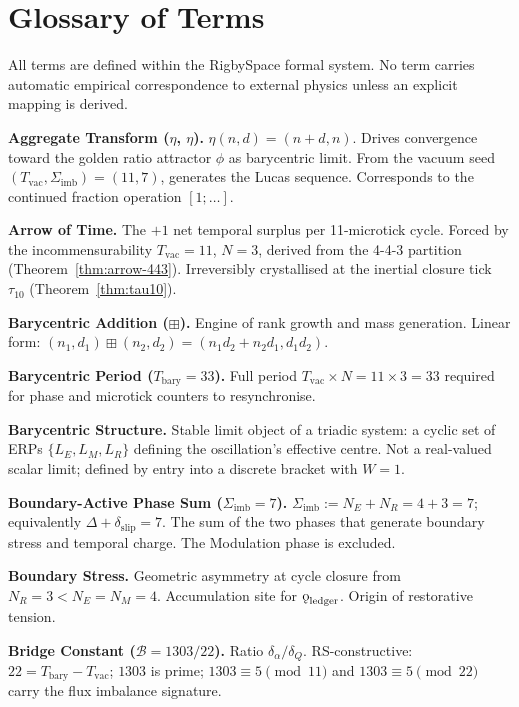\documentclass[11pt, letterpaper]{article}
\newcommand{\aop}{\eta}
\newcommand{\bplus}{\boxplus}
\newcommand{\koppa}{\mathbin{\text{\rm\k{o}}}}
\newcommand{\Tbary}{T_{\mathrm{bary}}}
\newcommand{\Sigimb}{\Sigma_{\mathrm{imb}}}
\theoremstyle{definition}
\theoremstyle{plain}
\begin{document}
\section{Glossary of Terms}\label{sec:glossary}

All terms are defined within the RigbySpace formal system.  No term carries
automatic empirical correspondence to external physics unless an explicit
mapping is derived.

\bigskip

\noindent\textbf{Aggregate Transform ($\eta$, $\aop$).}
$\aop(n,d)=(n+d,n)$.  Drives convergence toward the golden ratio attractor
$\phi$ as barycentric limit.  From the vacuum seed $(T_{\mathrm{vac}},\Sigimb)=(11,7)$,
generates the Lucas sequence.  Corresponds to the continued fraction
operation $[1;\ldots]$.

\medskip\noindent\textbf{Arrow of Time.}
The $+1$ net temporal surplus per 11-microtick cycle.  Forced by the
incommensurability $T_{\mathrm{vac}}=11$, $N=3$, derived from the 4-4-3
partition (Theorem~\ref{thm:arrow-443}).  Irreversibly crystallised at the
inertial closure tick $\tau_{10}$ (Theorem~\ref{thm:tau10}).

\medskip\noindent\textbf{Barycentric Addition ($\boxplus$).}
Engine of rank growth and mass generation.  Linear form:
$(n_1,d_1)\bplus(n_2,d_2)=(n_1 d_2+n_2 d_1,d_1 d_2)$.

\medskip\noindent\textbf{Barycentric Period ($T_{\mathrm{bary}}=33$).}
Full period $T_{\mathrm{vac}}\times N=11\times 3=33$ required for phase and
microtick counters to resynchronise.

\medskip\noindent\textbf{Barycentric Structure.}
Stable limit object of a triadic system: a cyclic set of ERPs
$\{L_E,L_M,L_R\}$ defining the oscillation's effective centre.  Not a
real-valued scalar limit; defined by entry into a discrete bracket with $W=1$.

\medskip\noindent\textbf{Boundary-Active Phase Sum ($\Sigimb=7$).}
$\Sigimb:=N_E+N_R=4+3=7$; equivalently $\Delta+\delta_{\mathrm{slip}}=7$.
The sum of the two phases that generate boundary stress and temporal charge.
The Modulation phase is excluded.

\medskip\noindent\textbf{Boundary Stress.}
Geometric asymmetry at cycle closure from $N_R=3<N_E=N_M=4$.  Accumulation
site for $\koppa_{\mathrm{ledger}}$.  Origin of restorative tension.

\medskip\noindent\textbf{Bridge Constant ($\mathcal{B}=1303/22$).}
Ratio $\delta_\alpha/\delta_Q$.  RS-constructive: $22=\Tbary-T_{\mathrm{vac}}$;
$1303$ is prime; $1303\equiv 5\pmod{11}$ and $1303\equiv 5\pmod{22}$ carry
the flux imbalance signature.
\end{document}
